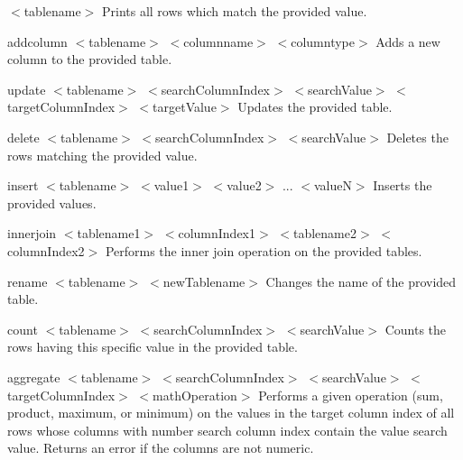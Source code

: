 $<$tablename$>$ Prints all rows which match the provided value.


\begin{DoxyItemize}
\item addcolumn $<$tablename$>$ $<$columnname$>$ $<$columntype$>$ Adds a new column to the provided table.
\item update $<$tablename$>$ $<$search\+Column\+Index$>$ $<$search\+Value$>$ $<$target\+Column\+Index$>$ $<$target\+Value$>$ Updates the provided table.
\item delete $<$tablename$>$ $<$search\+Column\+Index$>$ $<$search\+Value$>$ Deletes the rows matching the provided value.
\item insert $<$tablename$>$ $<$value1$>$ $<$value2$>$ ... $<$value\+N$>$ Inserts the provided values.
\item innerjoin $<$tablename1$>$ $<$column\+Index1$>$ $<$tablename2$>$ $<$column\+Index2$>$ Performs the inner join operation on the provided tables.
\item rename $<$tablename$>$ $<$new\+Tablename$>$ Changes the name of the provided table.
\item count $<$tablename$>$ $<$search\+Column\+Index$>$ $<$search\+Value$>$ Counts the rows having this specific value in the provided table.
\item aggregate $<$tablename$>$ $<$search\+Column\+Index$>$ $<$search\+Value$>$ $<$target\+Column\+Index$>$ $<$math\+Operation$>$ Performs a given operation (sum, product, maximum, or minimum) on the values in the target column index of all rows whose columns with number search column index contain the value search value. Returns an error if the columns are not numeric. 
\end{DoxyItemize}